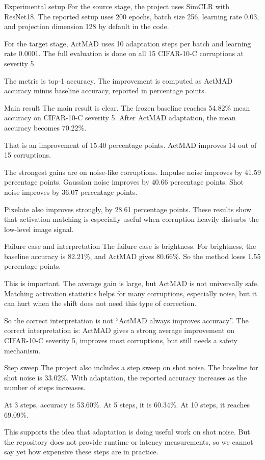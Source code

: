 \documentclass[11pt,a4paper]{article}
\begin{document}
\begin{rayanebox}{Experimental setup}
For the source stage, the project uses SimCLR with ResNet18. The reported setup uses 200 epochs, batch size 256, learning rate 0.03, and projection dimension 128 by default in the code.

For the target stage, ActMAD uses 10 adaptation steps per batch and learning rate 0.0001. The full evaluation is done on all 15 CIFAR-10-C corruptions at severity 5.

The metric is top-1 accuracy. The improvement is computed as ActMAD accuracy minus baseline accuracy, reported in percentage points.
\end{rayanebox}

\begin{rayanebox}{Main result}
The main result is clear. The frozen baseline reaches 54.82\% mean accuracy on CIFAR-10-C severity 5. After ActMAD adaptation, the mean accuracy becomes 70.22\%.

That is an improvement of 15.40 percentage points. ActMAD improves 14 out of 15 corruptions.

The strongest gains are on noise-like corruptions. Impulse noise improves by 41.59 percentage points. Gaussian noise improves by 40.66 percentage points. Shot noise improves by 36.07 percentage points.

Pixelate also improves strongly, by 28.61 percentage points. These results show that activation matching is especially useful when corruption heavily disturbs the low-level image signal.
\end{rayanebox}

\begin{rayanebox}{Failure case and interpretation}
The failure case is brightness. For brightness, the baseline accuracy is 82.21\%, and ActMAD gives 80.66\%. So the method loses 1.55 percentage points.

This is important. The average gain is large, but ActMAD is not universally safe. Matching activation statistics helps for many corruptions, especially noise, but it can hurt when the shift does not need this type of correction.

So the correct interpretation is not ``ActMAD always improves accuracy''. The correct interpretation is: ActMAD gives a strong average improvement on CIFAR-10-C severity 5, improves most corruptions, but still needs a safety mechanism.
\end{rayanebox}

\begin{rayanebox}{Step sweep}
The project also includes a step sweep on shot noise. The baseline for shot noise is 33.02\%. With adaptation, the reported accuracy increases as the number of steps increases.

At 3 steps, accuracy is 53.60\%. At 5 steps, it is 60.34\%. At 10 steps, it reaches 69.09\%.

This supports the idea that adaptation is doing useful work on shot noise. But the repository does not provide runtime or latency measurements, so we cannot say yet how expensive these steps are in practice.
\end{rayanebox}
\end{document}
